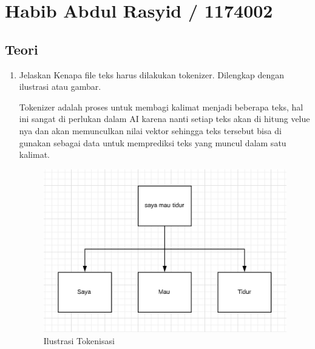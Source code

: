 \section{Habib Abdul Rasyid / 1174002}
\subsection{Teori}

\begin{enumerate}

\item Jelaskan Kenapa file teks harus dilakukan tokenizer. Dilengkap dengan ilustrasi atau gambar.\par
Tokenizer adalah proses untuk membagi kalimat menjadi beberapa teks, hal ini sangat di perlukan dalam AI karena nanti setiap teks akan di hitung velue nya dan akan memunculkan nilai vektor sehingga teks tersebut bisa di gunakan sebagai data untuk memprediksi teks yang muncul dalam satu kalimat.
\begin{figure}[ht]
\centering
\includegraphics[scale=0.4]{figures/1174002/chapter7/1.PNG}
\caption{Ilustrasi Tokenisasi}
\label{Contoh}
\end{figure}



\end{enumerate}
